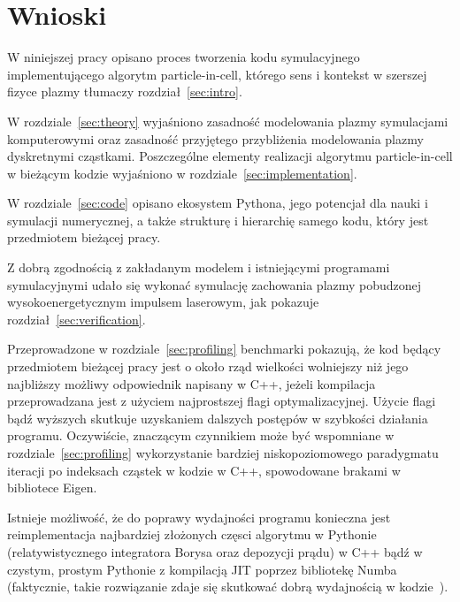 \section[Wnioski]{Wnioski}\label{sec:ending} %

W niniejszej pracy opisano proces tworzenia kodu symulacyjnego implementującego
algorytm particle-in-cell, którego sens i kontekst w szerszej fizyce plazmy tłumaczy rozdział~\ref{sec:intro}.

W rozdziale~\ref{sec:theory} wyjaśniono zasadność modelowania plazmy symulacjami komputerowymi oraz zasadność przyjętego przybliżenia
modelowania plazmy dyskretnymi cząstkami. Poszczególne elementy realizacji algorytmu particle-in-cell w bieżącym kodzie wyjaśniono w rozdziale~\ref{sec:implementation}.

W rozdziale~\ref{sec:code} opisano ekosystem Pythona, jego potencjał dla nauki i symulacji numerycznej, a także strukturę i hierarchię samego kodu, który jest przedmiotem bieżącej pracy.

Z dobrą zgodnością z zakładanym modelem i istniejącymi programami symulacyjnymi udało się wykonać symulację zachowania plazmy pobudzonej wysokoenergetycznym impulsem laserowym, jak pokazuje rozdział~\ref{sec:verification}.

Przeprowadzone w rozdziale~\ref{sec:profiling} benchmarki pokazują, że kod będący przedmiotem bieżącej pracy jest o około rząd wielkości wolniejszy niż jego najbliższy możliwy odpowiednik
napisany w C++, jeżeli kompilacja przeprowadzana jest z użyciem najprostszej flagi optymalizacyjnej. Użycie flagi  bądź wyższych skutkuje uzyskaniem dalszych postępów w szybkości działania programu.
Oczywiście, znaczącym czynnikiem może być wspomniane w rozdziale~\ref{sec:profiling} wykorzystanie bardziej niskopoziomowego paradygmatu iteracji po indeksach cząstek w kodzie w C++, spowodowane
brakami w bibliotece Eigen.

Istnieje możliwość, że do poprawy wydajności programu konieczna jest reimplementacja najbardziej złożonych częsci algorytmu w Pythonie (relatywistycznego integratora Borysa oraz depozycji prądu) w C++
bądź w czystym, prostym Pythonie z kompilacją JIT poprzez bibliotekę Numba (faktycznie, takie rozwiązanie zdaje się skutkować dobrą wydajnością w kodzie~\cite{fbpic}).

